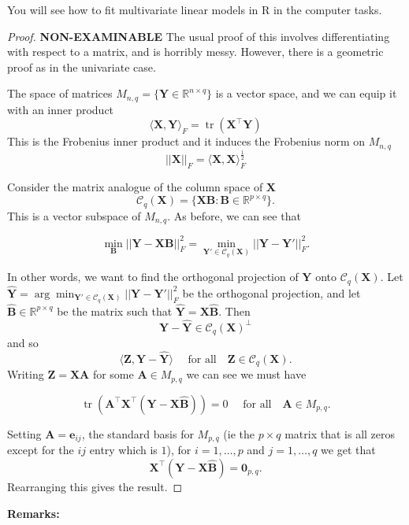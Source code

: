 \documentclass[
]{book}
\theoremstyle{definition}
\theoremstyle{definition}
\theoremstyle{definition}
\theoremstyle{definition}
\theoremstyle{remark}
\begin{document}
You will see how to fit multivariate linear models in R in the computer tasks.

\begin{proof}
\textbf{NON-EXAMINABLE}
The usual proof of this involves differentiating with respect to a matrix, and is horribly messy. However, there is a geometric proof as in the univariate case.

The space of matrices \(M_{n,q} = \{\mathbf Y\in \mathbb{R}^{n \times q} \}\) is a vector space, and we can equip it with an inner product
\[\langle \mathbf X, \mathbf Y\rangle_F = \operatorname{tr}(\mathbf X^\top \mathbf Y)\]
This is the Frobenius inner product and it induces the Frobenius norm on \(M_{n,q}\)
\[||\mathbf X||_F = \langle \mathbf X, \mathbf X\rangle_F^{\frac{1}{2}}\]

Consider the matrix analogue of the column space of \(\mathbf X\)
\[\mathcal{C}_q(\mathbf X)  =\{\mathbf X\mathbf B: \mathbf B\in \mathbb{R}^{p\times q}\}.\]
This is a vector subspace of \(M_{n,q}\). As before, we can see that

\[\min_{\mathbf B} ||\mathbf Y-\mathbf X\mathbf B||_F^2=\min_{\mathbf Y' \in \mathcal{C}_q(\mathbf X)} ||\mathbf Y- \mathbf Y'||_F^2.\]

In other words, we want to find the orthogonal projection of \(\mathbf Y\) onto \(\mathcal{C}_q(\mathbf X)\). Let \(\hat{\mathbf Y} = \arg \min_{\mathbf Y' \in \mathcal{C}_q(\mathbf X)} ||\mathbf Y- \mathbf Y'||_F^2\) be the orthogonal projection, and let \(\hat{\mathbf B}\in \mathbb{R}^{p \times q}\) be the matrix such that \(\hat{\mathbf Y}=\mathbf X\hat{\mathbf B}\). Then
\[\mathbf Y-\hat{\mathbf Y} \in \mathcal{C}_q(\mathbf X)^\perp\]
and so
\[\langle \mathbf Z, \mathbf Y-\hat{\mathbf Y}\rangle \quad \mbox{ for all}\quad \mathbf Z\in \mathcal{C}_q(\mathbf X).\]
Writing \(\mathbf Z= \mathbf X\mathbf A\) for some \(\mathbf A\in M_{p,q}\) we can see we must have

\[\operatorname{tr}(\mathbf A^\top \mathbf X^\top(\mathbf Y-\mathbf X\hat{\mathbf B}))=0 \quad \mbox{ for all}\quad \mathbf A\in M_{p,q}.\]

Setting \(\mathbf A=\mathbf e_{ij}\), the standard basis for \(M_{p,q}\) (ie the \(p\times q\) matrix that is all zeros except for the \(ij\) entry which is \(1\)), for \(i=1,\ldots, p\) and \(j=1, \ldots,q\) we get that
\[\mathbf X^\top(\mathbf Y-\mathbf X\hat{\mathbf B})=\boldsymbol 0_{p,q}.\]
Rearranging this gives the result.
\end{proof}

\textbf{Remarks:}
\end{document}
